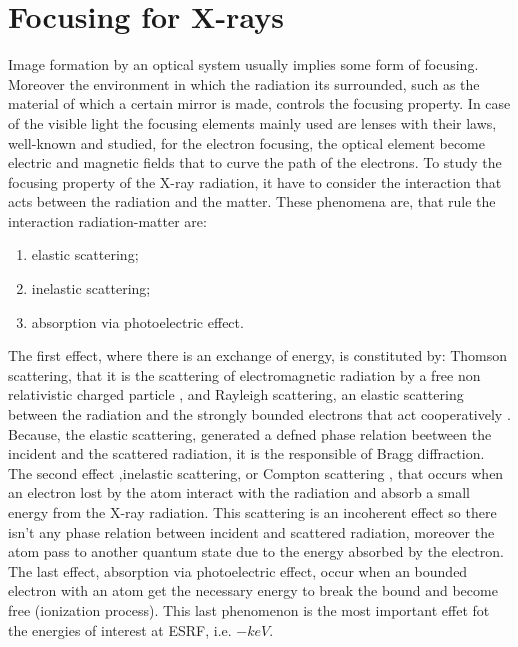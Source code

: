\chapter{Focusing for X-rays}
\label{Introduzione}
\thispagestyle{empty}


Image formation by an optical system usually implies some form of focusing. Moreover the environment in which the radiation its surrounded, such as the material of which a certain mirror is made, controls the focusing property. In case of the visible light the focusing elements mainly used are lenses with their laws, well-known and studied, for the electron focusing, the optical element become electric and magnetic fields that to curve the path of the electrons. To study the focusing property of the X-ray radiation, it have to consider the interaction that acts between the radiation and the matter. These phenomena are, that rule the interaction radiation-matter are:
\begin{enumerate}
\item elastic scattering;
\item inelastic scattering;
\item absorption via photoelectric effect.
\end{enumerate}
The first effect, where there is an exchange of energy, is constituted by: Thomson scattering, that it is the scattering of electromagnetic radiation by a free non relativistic charged particle \cite{ThomsonScattering}, and Rayleigh scattering, an elastic scattering between the radiation and the strongly bounded electrons that act cooperatively \cite{RayleighScattering}. Because, the elastic scattering, generated a defned phase relation beetween the incident and the scattered radiation, it is the responsible of Bragg diffraction. The second effect ,inelastic scattering, or Compton scattering \cite{ComptonScattering}, that occurs when an electron lost by the atom interact with the radiation and absorb a small energy from the X-ray radiation. This scattering is an incoherent effect so there isn't any phase relation between incident and scattered radiation, moreover the atom pass to another quantum state due to the energy absorbed by the electron. The last effect, absorption via photoelectric effect, occur when an bounded electron with an atom get the necessary energy to break the bound and become free (ionization process). This last phenomenon is the most important effet fot the energies of interest at ESRF, i.e. $- keV $.
%
